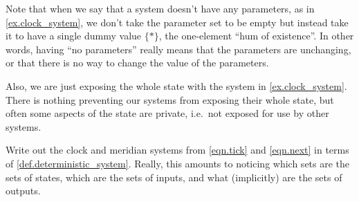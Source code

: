 \documentclass[DynamicalBook]{subfiles}
\begin{document}
Note that when we say that a system doesn't have any parameters, as in \cref{ex.clock_system}, we don't take the
parameter set to be empty but instead take it to have a single dummy value $\{*\}$, the one-element ``hum of existence''. In other words, having ``no parameters'' really means that the parameters are unchanging, or that there is no way to change the value of the parameters.

Also, we are just exposing the whole state with the system in \cref{ex.clock_system}. There is nothing preventing our systems
from exposing their whole state, but often some aspects of the state are private, i.e.\ not exposed for use by other systems. 

\begin{exercise}\label{exc.clock_meridian_diner}
  Write out the clock and meridian systems from \eqref{eqn.tick} and \eqref{eqn.next} in terms of
  \cref{def.deterministic_system}. Really, this amounts to noticing which sets
  are the sets of states, which are the sets of inputs, and what (implicitly)
  are the sets of outputs.
\end{exercise}
\end{document}
